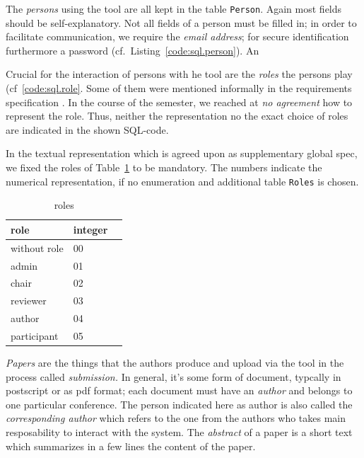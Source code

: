 \medskip{}



The \emph{persons} using the tool are all kept in the table
\texttt{Person}. Again most fields should be self-explanatory. Not all
fields of a person must be filled in; in order to facilitate communication,
we require the \emph{email address}; for secure identification furthermore
a password (cf.\ Listing~\ref{code:sql.person}).  An

%

\medskip{}

Crucial for the interaction of persons with he tool are the \emph{roles}
the persons play (cf~\ref{code:sql.role}. Some of them were mentioned
informally in the requirements specification \cite{coma:requirements}. In
the course of the semester, we reached at \emph{no agreement} how to
represent the role. Thus, neither the representation no the exact choice of
roles are indicated in the shown SQL-code.

%


In the textual representation which is agreed upon as supplementary global
spec, we fixed the roles of Table~\ref{tab:roles} to be mandatory. The
numbers indicate the numerical representation, if no enumeration and
additional table \texttt{Roles} is chosen.  

\begin{table}[htbp]
  \centering
  \begin{tabular}{lll}
    \\
    role & integer
    \\\hline
    without role & 00 
    \\
    admin & 01
    \\
    chair & 02
    \\
    reviewer & 03
    \\
    author & 04
    \\
    participant & 05
    \\
  \end{tabular}
  \caption{roles}
  \label{tab:roles}
\end{table}


\medskip%

\emph{Papers} are the things that the authors produce and upload via the
tool in the process called \emph{submission.} In general, it's some form of
document, typcally in postscript or as pdf format; each document must have
an \emph{author} and belongs to one particular conference. The person
indicated here as author is also called the \emph{corresponding author}
which refers to the one from the authors who takes main resposability to
interact with the system.
%
The \emph{abstract} of a paper is a short text which summarizes in a few
lines the content of the paper.

